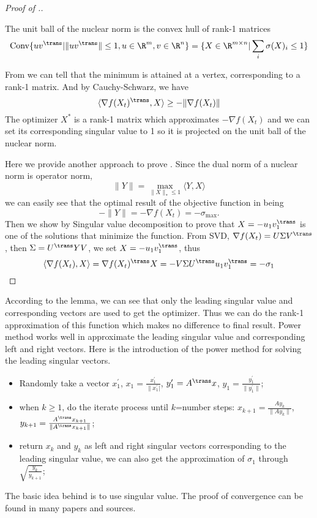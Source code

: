 \begin{proof} [Proof of .]
\begin{fact}
The unit ball of the nuclear norm is the convex hull of rank-1 matrices
\[
\mathrm{Conv}\{uv^\trans|\|uv^\trans\|\leq 1, u\in \R^m, v\in \R^n\}=\{X\in\R^{m\times n}|\sum_i{\sigma(X)_i}\leq 1\}
\]
\end{fact}
From  we can tell that the minimum is attained at a vertex, corresponding
to a rank-1 matrix. And by Cauchy-Schwarz, we have
\[
\langle\nabla f(X_t)^\trans, X\rangle \geq -\|\nabla f(X_t)\|
\]
The optimizer $X^*$ is a rank-1 matrix which approximates $-\nabla f(X_t)$ and we can set its corresponding singular value to 1 so it is projected on the unit ball of the nuclear norm.

Here we provide another approach to prove . Since the dual norm of a nuclear norm is operator norm,
\[
\|Y\| = \max_{\|X\|_*\leq 1}\langle Y, X\rangle
\]we can easily see that the optimal result of the objective function in  being
\[
-\|Y\| = -\nabla f(X_t)=-\sigma_{\max}.
\]
Then we show by Singular value decomposition to prove that $X = -u_1v_1^\trans$ is one of the solutions that minimize the function.
From SVD, $\nabla f(X_t) = U\Sigma V^\trans $, then $\Sigma = U^\trans YV$, we set $X=-u_1v_1^\trans$, thus
\[
\langle\nabla f(X_t), X\rangle = \nabla f(X_t)^\trans X = -V\Sigma U^\trans u_1v_1^\trans= -\sigma_1
\]
\end{proof}
According to the lemma, we can see that only the leading singular value and corresponding vectors are used to get the optimizer. Thus we can do the rank-1 approximation of this function which makes no difference to final result.
Power method works well in approximate the leading singular value and corresponding left and right vectors.
Here is the introduction of the power method for solving the leading singular vectors.
\begin{itemize}
\item Randomly take a vector $x_1^\prime$, $x_1=\frac{x_1^\prime}{\|x_1^\prime|}$, $y_1^\prime = A^\trans x$, $y_1 = \frac{y_1^\prime}{\|y_1^\prime\|}$;
\item when $k\geq1$, do the iterate process until $k$=number steps: $x_{k+1}=\frac{Ay_k}{\|Ay_k\|}$, $y_{k+1}=\frac{A^\trans x_{k+1}}{\|A^\trans x_{k+1}\|}$;
\item return $x_k$ and $y_k$ as left and right singular vectors corresponding to the leading singular value, we can also get the approximation of $\sigma_1$ through $\sqrt{\frac{y_k}{y_{k+1}}}$;
\end{itemize}


The basic idea behind is to use singular value. The proof of convergence can be found in many papers and sources.